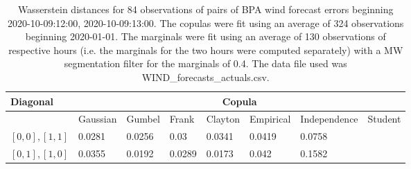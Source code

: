 \begin{table}[h] 
    \centering 
    \begin{tabular}{|l|l|l|l|l|l|l|l|} \hline 
        \textbf{Diagonal} & \multicolumn{7}{c|}{\textbf{Copula}} \\ \hline 
        & Gaussian & Gumbel & Frank & Clayton & Empirical & Independence & Student \\ \hline 
        $[0,0], [1,1]$ & 0.0281 & 0.0256 & 0.03 & 0.0341 & 0.0419 & 0.0758 &  \\ \hline 
        $[0,1], [1,0]$ & 0.0355 & 0.0192 & 0.0289 & 0.0173 & 0.042 & 0.1582 &  \\ \hline 
    \end{tabular} 
    \caption{Wasserstein distances for 84 observations of pairs of BPA wind forecast errors beginning 2020-10-09:12:00, 2020-10-09:13:00. The copulas were fit  using an average of 324 observations beginning 2020-01-01. The marginals were fit using an average of 130 observations of respective hours (i.e. the  marginals for the two hours were computed separately) with a MW segmentation filter for the marginals of 0.4. The data file used was WIND\_forecasts\_actuals.csv.} 
\end{table}